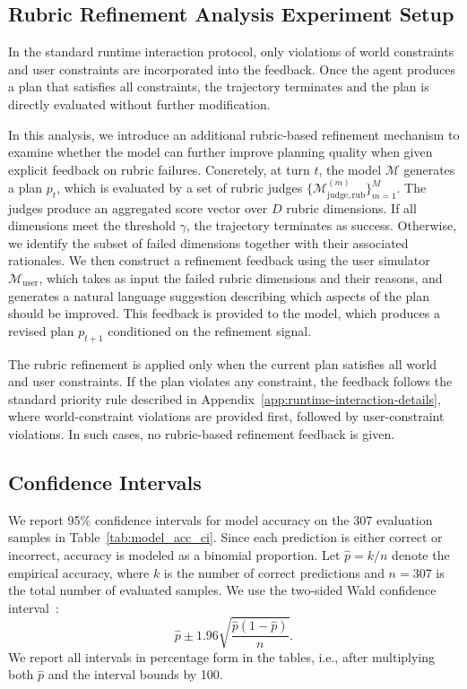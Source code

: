 \documentclass{llmxive}
\begin{document}
\subsection{Rubric Refinement Analysis Experiment Setup}
\label{app:refine-rubrics-analysis-details}

In the standard runtime interaction protocol, only violations of world constraints and user constraints are incorporated into the feedback. Once the agent produces a plan that satisfies all constraints, the trajectory terminates and the plan is directly evaluated without further modification.

In this analysis, we introduce an additional rubric-based refinement mechanism to examine whether the model can further improve planning quality when given explicit feedback on rubric failures.
Concretely, at turn $t$, the model $\mathcal{M}$ generates a plan $p_t$, which is evaluated by a set of rubric judges $\{\mathcal{M}^{(m)}_{\mathrm{judge,rub}}\}_{m=1}^{M}$. 
The judges produce an aggregated score vector over $D$ rubric dimensions. 
If all dimensions meet the threshold $\gamma$, the trajectory terminates as success. 
Otherwise, we identify the subset of failed dimensions together with their associated rationales.
We then construct a refinement feedback using the user simulator $\mathcal{M}_{\mathrm{user}}$, which takes as input the failed rubric dimensions and their reasons, and generates a natural language suggestion describing which aspects of the plan should be improved. 
This feedback is provided to the model, which produces a revised plan $p_{t+1}$ conditioned on the refinement signal.

The rubric refinement is applied only when the current plan satisfies all world and user constraints. 
If the plan violates any constraint, the feedback follows the standard priority rule described in Appendix~\ref{app:runtime-interaction-details}, where world-constraint violations are provided first, followed by user-constraint violations. 
In such cases, no rubric-based refinement feedback is given.

\subsection{Confidence Intervals}
\label{app:CI}

We report 95\% confidence intervals for model accuracy on the 307 evaluation samples in Table~\ref{tab:model_acc_ci}. 
Since each prediction is either correct or incorrect, accuracy is modeled as a binomial proportion. Let $\hat{p} = k/n$ denote the empirical accuracy, where $k$ is the number of correct predictions and $n=307$ is the total number of evaluated samples. 
We use the two-sided Wald confidence interval~\citep{kahouadji2025comprehensivecomparisonwaldwilson}:
\begin{equation}
\hat{p} \pm 1.96 \sqrt{\frac{\hat{p}(1-\hat{p})}{n}}.
\end{equation}
We report all intervals in percentage form in the tables, i.e., after multiplying both $\hat{p}$ and the interval bounds by 100. 
\end{document}
